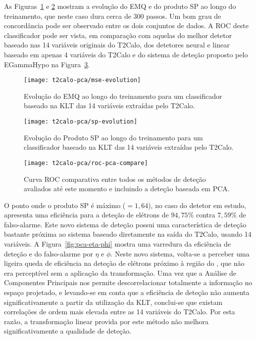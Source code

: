 As Figuras~\ref{fig:pca-mse-evo} e \ref{fig:pca-sp-evo} mostram a evolução do
EMQ e do produto SP ao longo do treinamento, que neste caso dura cerca de 300
passos. Um bom grau de concordância pode ser observado entre os dois conjuntos
de dados. A ROC deste classificador pode ser vista, em comparação com aquelas
do melhor detetor baseado nas 14 variáveis originais do T2Calo, dos detetores
neural e linear baseado em apenas 4 variáveis do T2Calo e do sistema de
deteção proposto pelo EGammaHypo na Figura~\ref{fig:pca-rocs}.

\begin{figure}
\begin{center}
\texttt{[image: t2calo-pca/mse-evolution]}
\end{center}
\caption{Evolução do EMQ ao longo do treinamento para um classificador baseado
na KLT das 14 variáveis extraídas pelo T2Calo.}
\label{fig:pca-mse-evo}
\end{figure}

\begin{figure}
\begin{center}
\texttt{[image: t2calo-pca/sp-evolution]}
\end{center}
\caption{Evolução do Produto SP ao longo do treinamento para um classificador
baseado na KLT das 14 variáveis extraídas pelo T2Calo.}
\label{fig:pca-sp-evo}
\end{figure}

\begin{figure}
\begin{center}
\texttt{[image: t2calo-pca/roc-pca-compare]}
\end{center}
\caption{Curva ROC comparativa entre todos os métodos de deteção avaliados até
este momento e incluindo a deteção baseada em PCA.}
\label{fig:pca-rocs}
\end{figure}

O ponto onde o produto SP é máximo ($=1,64$), no caso do detetor em estudo,
apresenta uma eficiência para a deteção de elétrons de $94,75$\% contra
$7,59$\% de falso-alarme. Este novo sistema de deteção possui uma
característica de deteção bastante próxima ao sistema baseado diretamente na
saída do T2Calo, usando 14 variáveis. A Figura~\ref{fig:pca-eta-phi} mostra
uma varredura da eficiência de deteção e do falso-alarme por $\eta$ e
$\phi$. Neste novo sistema, volta-se a perceber uma ligeira queda de
eficiência na deteção de elétrons próximo à região do , que não era
perceptível sem a aplicação da transformação. Uma vez que a Análise de
Componentes Principais nos permite descorrelacionar totalmente a informação no
espaço projetado, e levando-se em conta que a eficiência de deteção não
aumenta significativamente a partir da utilização da KLT, conclui-se que
existam correlações de ordem mais elevada entre as 14 variáveis do T2Calo. Por
esta razão, a transformação linear provida por este método não melhora
significativamente a qualidade de deteção.

